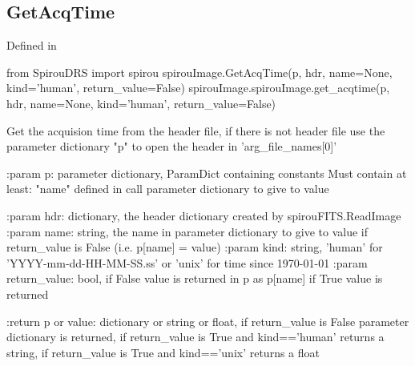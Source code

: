 \begin{minipage}{\textwidth}
\subsection{GetAcqTime}

Defined in \spirouImage{}

\begin{pythonbox}
from SpirouDRS import spirou
spirouImage.GetAcqTime(p, hdr, name=None, kind='human', return_value=False)
spirouImage.spirouImage.get_acqtime(p, hdr, name=None, kind='human', return_value=False)
\end{pythonbox}

\begin{pythondocstring}
Get the acquision time from the header file, if there is not header file
use the parameter dictionary "p" to open the header in 'arg_file_names[0]'

:param p: parameter dictionary, ParamDict containing constants
    Must contain at least:
        "name" defined in call
        parameter dictionary to give to value

:param hdr: dictionary, the header dictionary created by
            spirouFITS.ReadImage
:param name: string, the name in parameter dictionary to give to value
             if return_value is False (i.e. p[name] = value)
:param kind: string, 'human' for 'YYYY-mm-dd-HH-MM-SS.ss' or 'unix'
             for time since 1970-01-01
:param return_value: bool, if False value is returned in p as p[name]
                     if True value is returned

:return p or value: dictionary or string or float, if return_value is False
                    parameter dictionary is returned, if return_value is
                    True and kind=='human' returns a string, if return_value
                    is True and kind=='unix' returns a float
\end{pythondocstring}
\end{minipage}


